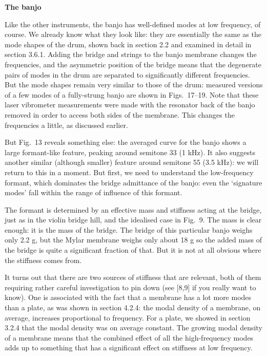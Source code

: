   \textbf{The banjo} 

  Like the other instruments, the banjo has well-defined modes at low 
  frequency, of course. We already know what they look like: they are 
  essentially the same as the mode shapes of the drum, shown back in section 
  2.2 and examined in detail in section 3.6.1. Adding the bridge and strings to 
  the banjo membrane changes the frequencies, and the asymmetric position of 
  the bridge means that the degenerate pairs of modes in the drum are separated 
  to significantly different frequencies. But the mode shapes remain very 
  similar to those of the drum: measured versions of a few modes of a 
  fully-strung banjo are shown in Figs.\ 17--19. Note that these laser 
  vibrometer measurements were made with the resonator back of the banjo 
  removed in order to access both sides of the membrane. This changes the 
  frequencies a little, as discussed earlier. 

  But Fig.\ 13 reveals something else: the averaged curve for the banjo shows a 
  large formant-like feature, peaking around semitone 33 (1 kHz). It also 
  suggests another similar (although smaller) feature around semitone 55 (3.5 
  kHz): we will return to this in a moment. But first, we need to understand 
  the low-frequency formant, which dominates the bridge admittance of the 
  banjo: even the `signature modes' fall within the range of influence of this 
  formant. 

  The formant is determined by an effective mass and stiffness acting at the 
  bridge, just as in the violin bridge hill, and the idealised case in Fig.\ 9. 
  The mass is clear enough: it is the mass of the bridge. The bridge of this 
  particular banjo weighs only 2.2 g, but the Mylar membrane weighs only about 
  18 g so the added mass of the bridge is quite a significant fraction of that. 
  But it is not at all obvious where the stiffness comes from. 

  It turns out that there are two sources of stiffness that are relevant, both 
  of them requiring rather careful investigation to pin down (see [8,9] if you 
  really want to know). One is associated with the fact that a membrane has a 
  lot more modes than a plate, as was shown in section 4.2.4: the modal density 
  of a membrane, on average, increases proportional to frequency. For a plate, 
  we showed in section 3.2.4 that the modal density was on average constant. 
  The growing modal density of a membrane means that the combined effect of all 
  the high-frequency modes adds up to something that has a significant effect 
  on stiffness at low frequency. 

